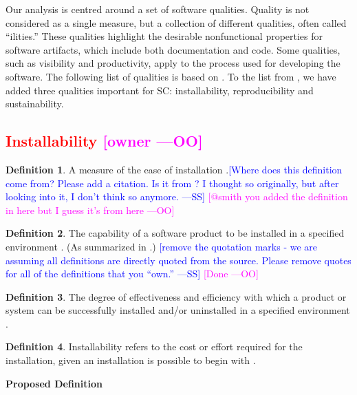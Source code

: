 \documentclass[letterpaper,cleveref]{lipics-v2019}
\newcommand{\authornote}[3]{\textcolor{#1}{[#3 ---#2]}}
\newcommand{\authornote}[3]{}
\newcommand{\wss}[1]{\authornote{blue}{SS}{#1}} %
\newcommand{\oo}[1]{\authornote{magenta}{OO}{#1}} %
\newcommand{\notdone}[1]{\textcolor{red}{#1}}
\theoremstyle{definition}
\newtheorem{defn}{Definition}
\begin{document}
Our analysis is centred around a set of software qualities.  Quality is not
considered as a single measure, but a collection of different qualities, often
called ``ilities.''  These qualities highlight the desirable nonfunctional
properties for software artifacts, which include both documentation and
code. Some qualities, such as visibility and productivity, apply to the process
used for developing the software. The following list of qualities is based on
\cite{GhezziEtAl2003}. To the list from \cite{GhezziEtAl2003}, we have added
three qualities important for SC: installability, reproducibility and
sustainability.

\subsection{\notdone{Installability} \oo{owner}}

\begin{defn}
	A measure of the ease of installation \citep{smith2015comparing}.\wss{Where
	does this definition come from? Please add a citation.  Is it from
	\citet{McCallEtAl1977}? I thought so originally, but after looking into it, I
	don't think so anymore.}
	\oo{@smith you added the definition in here but I guess it's from here}
\end{defn}

\begin{defn}
	The capability of a software product to be installed in a specified
	environment \citep{iso2001iec}. (As summarized in \citep{berander2005software}.)  \wss{remove the quotation marks -
	we are assuming all definitions are directly quoted from the source. Please
	remove quotes for all of the definitions that you ``own.''}
    \oo{Done} 
\end{defn}

\begin{defn} \label{InstallabilityDefnSelected2}
	The degree of effectiveness and efficiency with which a product or system can
	be successfully installed and/or uninstalled in a specified environment
	\citep{ISO/IEC25010}.
\end{defn}

\begin{defn} \label{InstallabilityDefnSelected1}
	Installability refers to the cost or effort required for the installation, given an installation is possible to begin with
	\citep{lenhard2013measuring}.
\end{defn}

\noindent \textbf{Proposed Definition}
\end{document}
